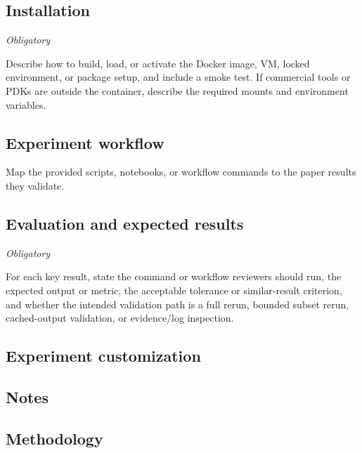 \documentclass{sigplanconf}
\begin{document}
\subsection{Installation}

{\em Obligatory}

Describe how to build, load, or activate the Docker image, VM, locked
environment, or package setup, and include a smoke test. If commercial tools or
PDKs are outside the container, describe the required mounts and environment
variables.

\subsection{Experiment workflow}

Map the provided scripts, notebooks, or workflow commands to the paper results
they validate.

\subsection{Evaluation and expected results}

{\em Obligatory}

For each key result, state the command or workflow reviewers should run, the
expected output or metric, the acceptable tolerance or similar-result criterion,
and whether the intended validation path is a full rerun, bounded subset rerun,
cached-output validation, or evidence/log inspection.

\subsection{Experiment customization}

\subsection{Notes}

\subsection{Methodology}
\end{document}

